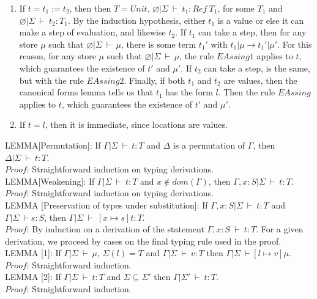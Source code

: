 \documentclass [proof]{article}
\newcommand{\tto}{\longrightarrow}
\newcommand{\env}{{\Gamma | \Sigma \ \vdash}}
\newcommand{\envE}{{\varnothing | \Sigma \ \vdash}}
\begin{document}
\begin{enumerate}
\item If $t = t_1 := t_2$, then then $T = Unit$, $\envE \ t_1 : Ref \ T_1$, for some $T_1$ and $\envE \ t_2 : T_1$. By the induction hypothesis, either $t_1$ is a value or else it can make a step of evaluation, and likewise $t_2$. If $t_1$ can take a step, then for any store $\mu$ such that $\envE \ \mu$, there is some term $t_1'$ with $t_1|\mu \tto t_1'|\mu'$. For this reason, for any store $\mu$ such that $\envE \ \mu$, the rule $EAssing1$ applies to $t$, which guarantees the existence of $t'$ and $\mu'$. If $t_2$ can take a step, is the same, but with the rule $EAssing2$. Finally, if both $t_1$ and $t_2$ are values, then the canonical forms lemma tells us that $t_1$ has the form $l$. Then the rule $EAssing$ applies to $t$, which guarantees the existence of $t'$ and $\mu'$.
\item If $t = l$, then it is immediate, since locations are values.

\end{enumerate}

LEMMA[Permutation]: If $\env \ t : T$ and $\Delta$ is a permutation of $\Gamma$, then $\Delta | \Sigma \ \vdash \ t : T$.\\
$Proof$: Straightforward induction on typing derivations.\ \\

LEMMA[Weakening]: If $\env \ t : T$ and $x \not \in dom(\Gamma)$, then $\Gamma, x : S | \Sigma \ \vdash \ t:T$.\\
$Proof$: Straightforward induction on typing derivations.\ \\

LEMMA [Preservation of types under substitution]: If $\Gamma , x:S  | \Sigma \ \vdash \ t : T$ and $\env s : S$, then $\env \ [x \mapsto s]t : T$.\\
$Proof$: By induction on a derivation of the statement $ \Gamma, x:S \ \vdash \ t : T$. For a given derivation, we proceed by cases on the final typing rule used in the proof.\\

LEMMA [1]: If $\env \ \mu$, $\Sigma(l) = T$ and $ \env \ v:T$ then $\env [l \mapsto v]\mu$.\\
$Proof$: Straightforward induction.\ \\

LEMMA [2]: If $\env \ t : T$ and $\Sigma \subseteq \Sigma'$ then $\Gamma | \Sigma' \ \vdash \ t:T$.\\
$Proof$: Straightforward induction.\ \\
\end{document}
